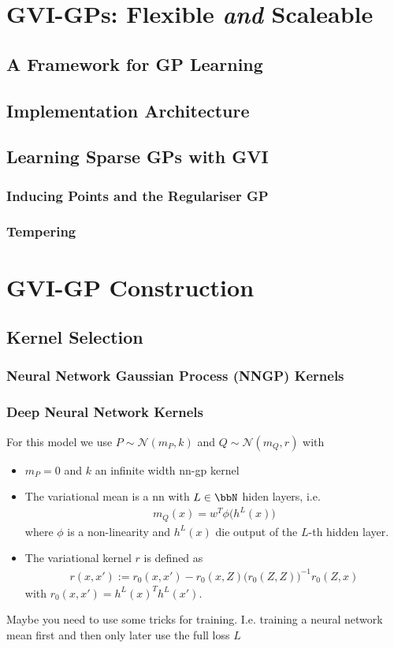 \documentclass{article}
\numberwithin{equation}{section}
\begin{document}
\newpage
\section{GVI-GPs: Flexible \textit{and} Scaleable}
\subsection{A Framework for GP Learning}
\subsection{Implementation Architecture}
\subsection{Learning Sparse GPs with GVI}
\subsubsection{Inducing Points and the Regulariser GP}
\subsubsection{Tempering}


\newpage
\section{GVI-GP Construction}
\subsection{Kernel Selection}
\subsubsection{Neural Network Gaussian Process (NNGP) Kernels}
\subsubsection{Deep Neural Network Kernels}
For this model we use $P \sim \mathcal{N}(m_P, k) $ and $Q \sim \mathcal{N}(m_Q, r)$ with 
\begin{itemize}
    \item $m_P = 0$ and $k$ an infinite width nn-gp kernel
    \item The variational mean is a nn with $L \in \bbN$ hiden layers, i.e. 
    \begin{align}
        m_Q(x) = w^T \phi\big( h^{L}(x) \big)
    \end{align}
    where $\phi$ is a non-linearity and $h^L(x)$ die output of the $L$-th hidden layer. 
    \item 
    The variational kernel $r$ is defined as 
    \begin{align}
        r(x,x') := r_0(x,x') - r_0(x,Z) \big( r_0(Z,Z) \big)^{-1} r_0(Z,x)
    \end{align}
    with $r_0(x,x') = h^{L}(x)^T h^{L}(x')$.
\end{itemize}
Maybe you need to use some tricks for training. I.e. training a neural network mean first and then only later use the full loss $L$
\end{document}
